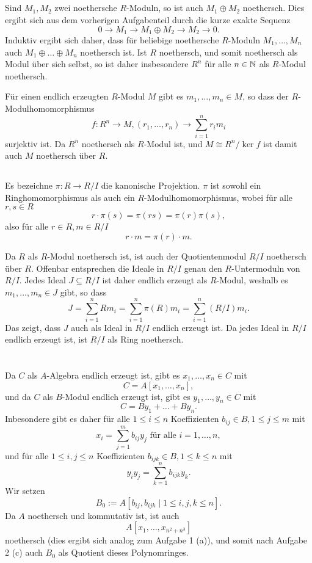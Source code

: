 \documentclass[a4paper,10pt]{article}
\begin{document}
\subsection{}
Sind $M_1, M_2$ zwei noethersche $R$-Moduln, so ist auch $M_1 \oplus M_2$ noethersch. Dies ergibt sich aus dem vorherigen Aufgabenteil durch die kurze exakte Sequenz
\[
 0 \to M_1 \to M_1 \oplus M_2 \to M_2 \to 0.
\]
Induktiv ergibt sich daher, dass für beliebige noethersche $R$-Moduln $M_1, \ldots, M_n$ auch $M_1 \oplus \ldots \oplus M_n$ noethersch ist. Ist $R$ noethersch, und somit noethersch als Modul über sich selbst, so ist daher insbesondere $R^n$ für alle $n \in \mathbb{N}$ als $R$-Modul noethersch.

Für einen endlich erzeugten $R$-Modul $M$ gibt es $m_1, \ldots, m_n \in M$, so dass der $R$-Modulhomomorphismus
\[
 f: R^n \to M, (r_1, \ldots, r_n) \to \sum_{i=1}^n r_i m_i
\]
surjektiv ist. Da $R^n$ noethersch als $R$-Modul ist, und $M \cong R^n / \ker f$ ist damit auch $M$ noethersch über $R$.


\subsection{}
Es bezeichne $\pi : R \to R/I$ die kanonische Projektion. $\pi$ ist sowohl ein Ringhomomorphismus als auch ein $R$-Modulhomomorphismus, wobei für alle $r, s \in R$
\[
 r \cdot \pi(s) = \pi(rs) = \pi(r) \pi(s),
\]
also für alle $r \in R, m \in R/I$
\[
 r \cdot m = \pi(r) \cdot m.
\]

Da $R$ als $R$-Modul noethersch ist, ist auch der Quotientenmodul $R/I$ noethersch über $R$. Offenbar entsprechen die Ideale in $R/I$ genau den $R$-Untermoduln von $R/I$. Jedes Ideal $J \subseteq R/I$ ist daher endlich erzeugt als $R$-Modul, weshalb es $m_1, \ldots, m_n \in J$ gibt, so dass
\[
 J = \sum_{i=1}^n R m_i = \sum_{i=1}^n \pi(R) m_i = \sum_{i=1}^n (R/I) m_i.
\]
Das zeigt, dass $J$ auch als Ideal in $R/I$ endlich erzeugt ist. Da jedes Ideal in $R/I$ endlich erzeugt ist, ist $R/I$ als Ring noethersch.


\section{}
Da $C$ als $A$-Algebra endlich erzeugt ist, gibt es $x_1, \ldots, x_n \in C$ mit
\[
 C = A[x_1, \ldots, x_n],
\]
und da $C$ als $B$-Modul endlich erzeugt ist, gibt es $y_1, \ldots, y_n \in C$ mit
\[
 C = By_1 + \ldots + By_n.
\]
Inbesondere gibt es daher für alle $1 \leq i \leq n$ Koeffizienten $b_{ij} \in B, 1 \leq j \leq m$ mit
\[
 x_i = \sum_{j=1}^m b_{ij} y_j \text{ für alle } i = 1, \ldots, n,
\]
und für alle $1 \leq i,j \leq n$ Koeffizienten $b_{ijk} \in B, 1 \leq k \leq n$ mit
\[
 y_i y_j = \sum_{k=1}^n b_{ijk} y_k.
\]
Wir setzen
\[
 B_0 := A[b_{ij}, b_{ijk} \mid 1 \leq i,j,k \leq n].
\]
Da $A$ noethersch und kommutativ ist, ist auch
\[
 A[x_1, \ldots, x_{n^2 + n^3}]
\]
noethersch (dies ergibt sich analog zum Aufgabe 1 (a)), und somit nach Aufgabe 2 (c) auch $B_0$ als Quotient dieses Polynomringes. 
\end{document}
